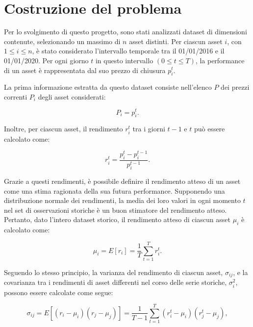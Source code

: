\section{Costruzione del problema}\label{sec:problema}

Per lo svolgimento di questo progetto, sono stati analizzati dataset di 
dimensioni contenute, selezionando un massimo di $n$ asset distinti. Per ciascun 
asset \(i\), con \(1 \leq i \leq n\), è stato considerato l'intervallo temporale 
tra il 01/01/2016 e il 01/01/2020. Per ogni giorno \(t\) in questo intervallo 
\((0 \leq t \leq T)\), la performance di un asset è rappresentata dal suo prezzo di 
chiusura \(p_i^t\).


La prima informazione estratta da questo dataset consiste nell'elenco \(P\) dei 
prezzi correnti \(P_i\) degli asset considerati:

\begin{equation}\label{eqn:prezzo}
    P_i = p_i^t. 
\end{equation}

Inoltre, per ciascun asset, il rendimento \(r_i^t\) tra i giorni \(t-1\) e \(t\) 
può essere calcolato come:

\begin{equation}\label{eqn:rendimentoreale}
    r_i^t = \frac{p_i^t - p_i^{t-1}}{p_i^{t-1}}. 
\end{equation}

Grazie a questi rendimenti, è possibile definire il rendimento atteso di un asset 
come una stima ragionata della sua futura performance. Supponendo una distribuzione 
normale dei rendimenti, la media dei loro valori in ogni momento \(t\) nel set di 
osservazioni storiche è un buon stimatore del rendimento atteso. Pertanto, dato 
l'intero dataset storico, il rendimento atteso di ciascun asset \(\mu_i\) è calcolato come:

\begin{equation}\label{eqn:rendimentoatteso}
    \mu_i = E[r_i] = \frac{1}{T} \sum_{t=1}^T r_i^t. 
\end{equation}

Seguendo lo stesso principio, la varianza del rendimento di ciascun asset, $\sigma_{ij}$, e la 
covarianza tra i rendimenti di asset differenti nel corso delle serie storiche, $\sigma_i^2$, 
possono essere calcolate come segue:

\begin{equation}\label{eqn:varianza}
    \sigma_{ij} = E[(r_i - \mu_i)(r_j - \mu_j)] = \frac{1}{T-1} \sum_{t=1}^T (r_i^t - \mu_i)(r_j^t - \mu_j),
\end{equation}

